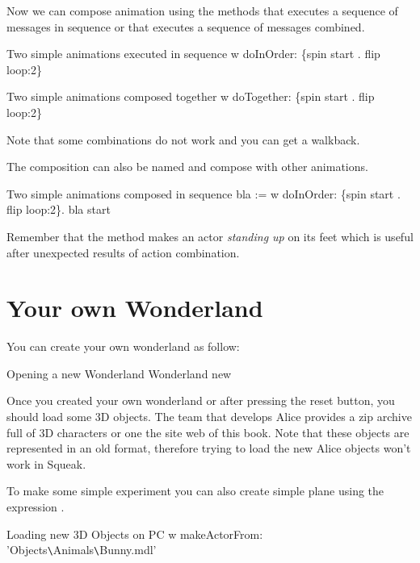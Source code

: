 Now we can compose animation using the methods  that executes a sequence of messages in sequence or  that executes a sequence of messages combined. 

\begin{scriptwithtitle}{Two simple animations executed in sequence}
w doInOrder: \{spin start . flip loop:2\}
\end{scriptwithtitle}

\begin{scriptwithtitle}{Two simple animations composed together}
w doTogether: \{spin start . flip loop:2\}
\end{scriptwithtitle}

Note that some combinations do not work and you can get a walkback. 

The composition can also be named and compose with other animations.
\begin{scriptwithtitle}{Two simple animations composed in sequence}
bla := w doInOrder: \{spin start . flip loop:2\}.
bla start
\end{scriptwithtitle}

Remember that the method  makes an actor \textit{standing up} on its feet which is useful after unexpected results of action combination. 


\section{Your own Wonderland}\label{sec:yourown}

You can create your own wonderland as follow: 

\begin{scriptwithtitle}{Opening a new Wonderland}
Wonderland new
\end{scriptwithtitle}


Once you created your own wonderland or after pressing the reset button,
you should load some 3D objects. The team that develops Alice provides 
a zip archive full of 3D characters  or one the site web of this book. Note that these objects are represented in an old format, therefore trying to load the new Alice objects won't work in Squeak. 

To make some simple experiment you can also create simple plane using the expression .

\begin{scriptwithtitle}{Loading new 3D Objects on PC}
w makeActorFrom: 'Objects\verb=\=Animals\verb=\=Bunny.mdl'
\end{scriptwithtitle}

